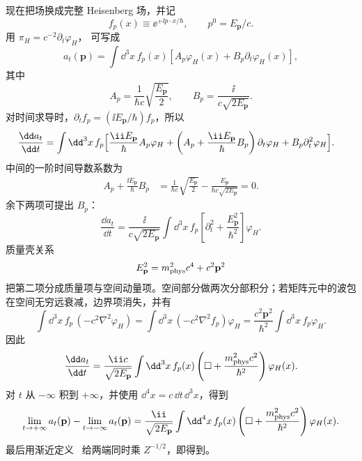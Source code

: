 \begin{derivation}
现在把场换成完整 Heisenberg 场，并记
\begin{equation*}
 f_p(x)\equiv \ee^{+\ii p\cdot x/\hbar},
 \qquad p^0=E_{\mathbf p}/c.
\end{equation*}
用 $\pi_H=c^{-2}\partial_t\varphi_H$， 可写成
\begin{equation*}
 a_t(\mathbf p)
 =\int\dd^3 x\,f_p(x)
 \left[
 A_p\varphi_H(x)+B_p\partial_t\varphi_H(x)
 \right],
\end{equation*}
其中
\begin{equation*}
 A_p=\frac{1}{\hbar c}\sqrt{\frac{E_{\mathbf p}}{2}},
 \qquad
 B_p=\frac{\ii}{c\sqrt{2E_{\mathbf p}}}.
\end{equation*}
对时间求导时，$\partial_t f_p=(\ii E_{\mathbf p}/\hbar)f_p$，所以
\begin{align*}
 \frac{\dd a_t}{\dd t}
 =\int\dd^3 x\,f_p
 \Bigl[&\frac{\ii E_{\mathbf p}}{\hbar}A_p\varphi_H
 +\left(A_p+\frac{\ii E_{\mathbf p}}{\hbar}B_p\right)
 \partial_t\varphi_H
 +B_p\partial_t^2\varphi_H\Bigr].
\end{align*}
中间的一阶时间导数系数为
\begin{align*}
 A_p+\frac{\ii E_{\mathbf p}}{\hbar}B_p
 &=\frac{1}{\hbar c}\sqrt{\frac{E_{\mathbf p}}{2}}
 -\frac{E_{\mathbf p}}{\hbar c\sqrt{2E_{\mathbf p}}}=0.
\end{align*}
余下两项可提出 $B_p$：
\begin{equation*}
 \frac{\dd a_t}{\dd t}
 =\frac{\ii}{c\sqrt{2E_{\mathbf p}}}
 \int\dd^3 x\,f_p
 \left[
 \partial_t^2+\frac{E_{\mathbf p}^2}{\hbar^2}
 \right]\varphi_H.
\end{equation*}
质量壳关系
\begin{equation*}
 E_{\mathbf p}^2=m_{\rm phys}^2c^4+c^2\mathbf p^2
\end{equation*}
把第二项分成质量项与空间动量项。空间部分做两次分部积分；若矩阵元中的波包在空间无穷远衰减，边界项消失，并有
\begin{equation*}
 \int\dd^3 x\,f_p\,(-c^2\nabla^2\varphi_H)
 =\int\dd^3 x\,(-c^2\nabla^2 f_p)\varphi_H
 =\frac{c^2\mathbf p^2}{\hbar^2}
 \int\dd^3 x\,f_p\varphi_H.
\end{equation*}
因此
\begin{equation*}
 \frac{\dd a_t}{\dd t}
 =\frac{\ii c}{\sqrt{2E_{\mathbf p}}}
 \int\dd^3 x\,f_p(x)
 \left(\Box+\frac{m_{\rm phys}^2c^2}{\hbar^2}\right)
 \varphi_H(x).
\end{equation*}
对 $t$ 从 $-\infty$ 积到 $+\infty$，并使用 $\dd^4 x=c\,\dd t\,\dd^3 x$，得到
\begin{equation*}
 \lim_{t\to+\infty}a_t(\mathbf p)
 -\lim_{t\to-\infty}a_t(\mathbf p)
 =\frac{\ii}{\sqrt{2E_{\mathbf p}}}
 \int\dd^4 x\,f_p(x)
 \left(\Box+\frac{m_{\rm phys}^2c^2}{\hbar^2}\right)
 \varphi_H(x).
\end{equation*}
最后用渐近定义~ 给两端同时乘 $Z^{-1/2}$，即得到。


\end{derivation}
